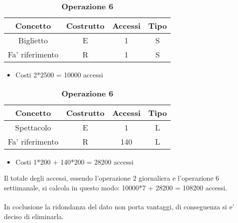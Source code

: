 \documentclass[10pt]{article}
\begin{document}
	\begin{table}[!h]
		\centering
		\caption{\textbf{Operazione 2}} \label{tab:sometab}
		\begin{tabular}{|c|c|c|c|}
			\hline
			\textbf{Concetto} & \textbf{Costrutto} & \textbf{Accessi} & \textbf{Tipo} \\
			\hline
			Biglietto & E & 1 & S \\
			\hline
			Fa' riferimento & R & 1 & S \\
			\hline
		\end{tabular}
		\begin{itemize}
			\item Costi 2*2500 = 10000 accessi 
		\end{itemize}
		\caption{\textbf{Operazione 6}} \label{tab:sometab}
		\begin{tabular}{|c|c|c|c|}
			\hline
			\textbf{Concetto} & \textbf{Costrutto} & \textbf{Accessi} & \textbf{Tipo} \\
			\hline
			Spettacolo & E & 1 & L \\
			\hline
			Fa' riferimento & R &140&L\\
			\hline
		\end{tabular}
		\begin{itemize}
			\item Costi 1*200 + 140*200 = 28200 accessi
		\end{itemize}
	\end{table}
	Il totale degli accessi, essendo l'operazione 2 giornaliera e l'operazione 6 settimanale, si calcola in questo modo: 10000*7 + 28200 = 108200 accessi.\\\\
	In coclusione la ridondanza del dato non porta vantaggi, di conseguenza si e' deciso di eliminarla.
\end{document}
